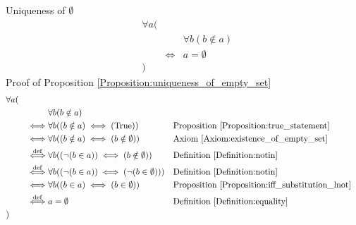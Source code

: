 \begin{prop}
\label{Proposition:uniqueness_of_empty_set}
Uniqueness of $\emptyset$
\begin{align*}
& \forall a ( \\
& & & \forall b (b \notin a) \\
& & \iff & a = \emptyset \\
& )
\end{align*}
Proof of Proposition \ref{Proposition:uniqueness_of_empty_set}
\begin{align*}
& \forall a ( \\
& & & \forall b (b \notin a) \\
& & \iff & \forall b ((b \notin a) \iff (\text{True}))
& & \text{Proposition \ref{Proposition:true_statement}} \\
& & \iff & \forall b ((b \notin a) \iff (b \notin \emptyset))
& & \text{Axiom \ref{Axiom:existence_of_empty_set}} \\
& & \overset{\operatorname{def}}{\iff} & \forall b ((\lnot (b \in a)) \iff (b \notin \emptyset))
& & \text{Definition \ref{Definition:notin}} \\
& & \overset{\operatorname{def}}{\iff} & \forall b ((\lnot (b \in a)) \iff (\lnot (b \in \emptyset)))
& & \text{Definition \ref{Definition:notin}} \\
& & \iff & \forall b ((b \in a) \iff (b \in \emptyset))
& & \text{Proposition \ref{Proposition:iff_substitution_lnot}} \\
& & \overset{\operatorname{def}}{\iff} & a = \emptyset
& & \text{Definition \ref{Definition:equality}} \\
& )
\end{align*}
\end{prop}

